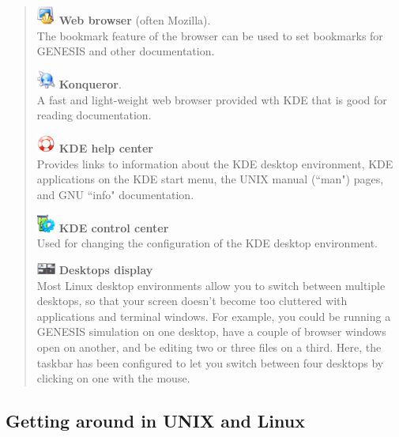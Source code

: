 \documentclass[12pt]{article}
\begin{document}
\begin{quote}
	\includegraphics[width=0.05\textwidth]{figs/konsole.eps} {\bf Web browser} (often Mozilla).\\
	The bookmark feature of the browser can be used to set bookmarks for GENESIS and other documentation.

	\includegraphics[width=0.05\textwidth]{figs/konqueror.eps} {\bf Konqueror}.\\
	A fast and light-weight web browser provided wth KDE that is good for reading documentation.

	\includegraphics[width=0.05\textwidth]{figs/khelpcenter.eps} {\bf KDE help center }\\
	Provides links to information about the KDE desktop environment, KDE applications on the KDE start menu, the UNIX manual (``man") pages, and GNU ``info" documentation.

	\includegraphics[width=0.05\textwidth]{figs/kcontrol.eps} {\bf KDE control center}\\
	Used for changing the configuration of the KDE desktop environment.
	
	\includegraphics[width=0.05\textwidth]{figs/desktops.eps} {\bf Desktops display}\\
	Most Linux desktop environments allow you to switch between multiple desktops, so that your screen doesn't become too cluttered with applications and terminal windows. For example, you could be running a GENESIS simulation on one desktop, have a couple of browser windows open on another, and be editing two or three files on a third. Here, the taskbar has been configured to let you switch between four desktops by clicking on one with the mouse. 
\end{quote}

\subsection*{Getting around in UNIX and Linux}
\end{document}

